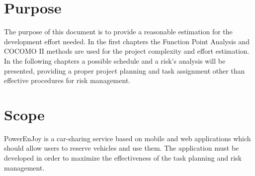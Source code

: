 \section{Purpose}
The purpose of this document is to provide a reasonable estimation for the development effort needed.
In the first chapters the Function Point Analysis and COCOMO II methods are used for the project complexity and effort estimation. In the following chapters a possible schedule and a risk's analysis will be presented, providing a proper project planning and task assignment other than effective procedures for risk management.

\section{Scope}
PowerEnJoy is a car-sharing service based on mobile and web applications which should allow users to reserve vehicles and use them.
The application must be developed in order to maximize the effectiveness of the task planning and risk management.